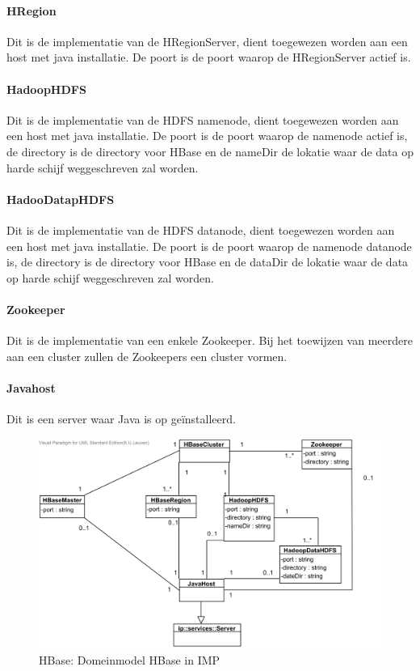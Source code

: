 \paragraph{HRegion} Dit is de implementatie van de HRegionServer, dient toegewezen worden aan een host met java installatie. De poort is de poort waarop de HRegionServer actief is. 

\paragraph{HadoopHDFS} Dit is de implementatie van de HDFS namenode, dient toegewezen worden aan een host met java installatie. De poort is de poort waarop de namenode actief is, de directory is de directory voor HBase  en de nameDir de lokatie waar de data op harde schijf weggeschreven zal worden. 

\paragraph{HadooDatapHDFS} Dit is de implementatie van de HDFS datanode, dient toegewezen worden aan een host met java installatie. De poort is de poort waarop de namenode datanode is, de directory is de directory voor HBase en de dataDir de lokatie waar de data op harde schijf weggeschreven zal worden. 

\paragraph{Zookeeper} Dit is de implementatie van een enkele Zookeeper. Bij het toewijzen van meerdere aan een cluster zullen de Zookeepers een cluster vormen. 

\paragraph{Javahost} Dit is een server waar Java is op geïnstalleerd. 

\begin{figure}[ht!]
\centering
\includegraphics[width=\linewidth]{img/HBase-Domeinmodel.png}
\caption{HBase: Domeinmodel HBase in IMP}
\label{fig:imp-hbase-domeinmodel}
\end{figure}

